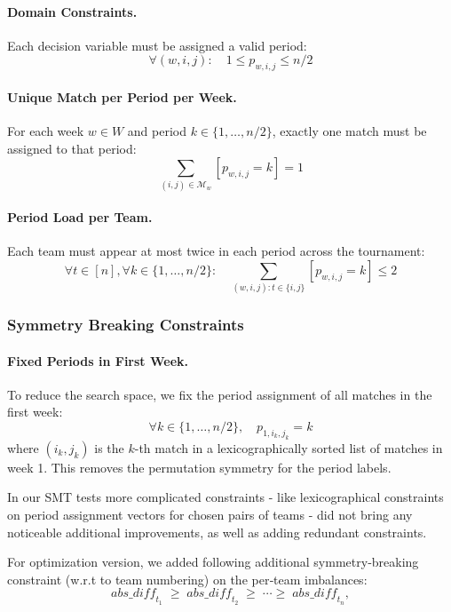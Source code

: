 \paragraph{Domain Constraints.}
Each decision variable must be assigned a valid period:
\[
\forall (w,i,j): \quad 1 \leq p_{w,i,j} \leq n/2
\]

\paragraph{Unique Match per Period per Week.}
For each week $w \in W$ and period $k \in \{1, \dots, n/2\}$, exactly one match must be assigned to that period:
\[
\sum_{(i,j) \in \mathcal{M}_w} [p_{w,i,j} = k] = 1
\]

\paragraph{Period Load per Team.}
Each team must appear at most twice in each period across the tournament:
\[
\forall t \in [n], \forall k \in \{1, \dots, n/2\}: \quad \sum_{(w,i,j) : t \in \{i,j\}} [p_{w,i,j} = k] \leq 2
\]

\subsubsection*{Symmetry Breaking Constraints}

\paragraph{Fixed Periods in First Week.}
To reduce the search space, we fix the period assignment of all matches in the first week:
\[
\forall k \in \{1, \dots, n/2\},\quad p_{1,i_k,j_k} = k
\]
where $(i_k, j_k)$ is the $k$-th match in a lexicographically sorted list of matches in week 1. This removes the permutation symmetry for the period labels.

In our SMT tests more complicated constraints - like lexicographical constraints on period assignment vectors for chosen pairs of teams - did not bring any noticeable additional improvements, as well as adding redundant constraints. 

For optimization version, we added following additional symmetry‑breaking constraint (w.r.t to team numbering) on the per‑team imbalances:
\[
\mathit{abs\_diff}_{t_1}\;\ge\;\mathit{abs\_diff}_{t_2}\;\ge\;\cdots\ge\;\mathit{abs\_diff}_{t_n},
\]


